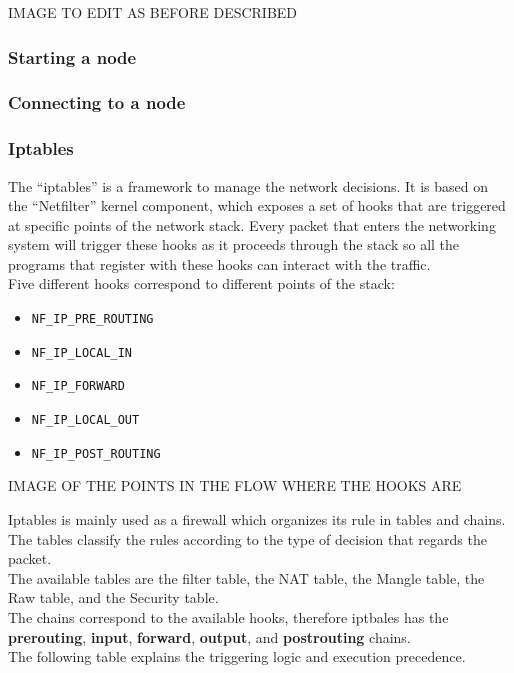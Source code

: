 \documentclass[12pt]{article}
\begin{document}
	IMAGE TO EDIT AS BEFORE DESCRIBED\\

	\subsubsection{Starting a node}
	
	\subsubsection{Connecting to a node}

	\subsubsection{Iptables}

	The ``iptables'' is a framework to manage the network decisions. It is based on the ``Netfilter'' kernel component, which exposes a set of hooks that are triggered at specific points of the network stack. Every packet that enters the networking system will trigger these hooks as it proceeds through the stack so all the programs that register with these hooks can interact with the traffic.\\
	Five different hooks correspond to different points of the stack:\\

	\begin{itemize}
		\item \lstinline{NF_IP_PRE_ROUTING}
		\item \lstinline{NF_IP_LOCAL_IN}
		\item \lstinline{NF_IP_FORWARD}
		\item \lstinline{NF_IP_LOCAL_OUT}
		\item \lstinline{NF_IP_POST_ROUTING}
	\end{itemize}

	IMAGE OF THE POINTS IN THE FLOW WHERE THE HOOKS ARE
	
	Iptables is mainly used as a firewall which organizes its rule in tables and chains. The tables classify the rules according to the type of decision that regards the packet.\\
	The available tables are the filter table, the NAT table, the Mangle table, the Raw table, and the Security table.\\
	The chains correspond to the available hooks, therefore iptbales has the \textbf{prerouting}, \textbf{input}, \textbf{forward}, \textbf{output}, and \textbf{postrouting} chains.\\
	The following table explains the triggering logic and execution precedence.\\
\end{document}
